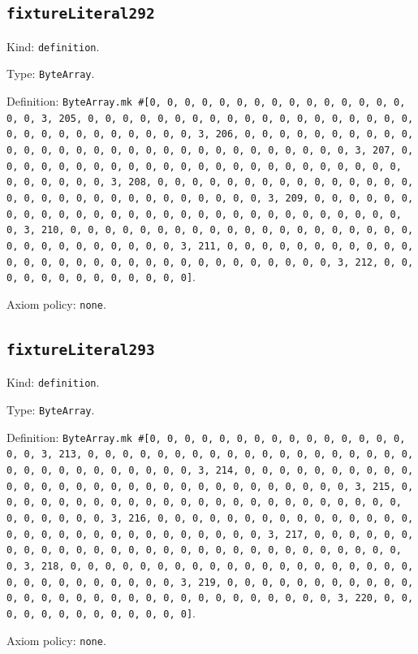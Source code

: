 \documentclass[11pt]{article}
\begin{document}
\subsection*{\texttt{fixtureLiteral292}}
\noindent Kind: \texttt{definition}.\par
\noindent Type: \texttt{ByteArray}.\par
\noindent Definition: \texttt{ByteArray.mk \#[0, 0, 0, 0, 0, 0, 0, 0, 0, 0, 0, 0, 0, 0, 0, 0, 0, 3, 205, 0, 0, 0, 0, 0, 0, 0, 0, 0, 0, 0, 0, 0, 0, 0, 0, 0, 0, 0, 0, 0, 0, 0, 0, 0, 0, 0, 0, 0, 0, 3, 206, 0, 0, 0, 0, 0, 0, 0, 0, 0, 0, 0, 0, 0, 0, 0, 0, 0, 0, 0, 0, 0, 0, 0, 0, 0, 0, 0, 0, 0, 0, 3, 207, 0, 0, 0, 0, 0, 0, 0, 0, 0, 0, 0, 0, 0, 0, 0, 0, 0, 0, 0, 0, 0, 0, 0, 0, 0, 0, 0, 0, 0, 0, 3, 208, 0, 0, 0, 0, 0, 0, 0, 0, 0, 0, 0, 0, 0, 0, 0, 0, 0, 0, 0, 0, 0, 0, 0, 0, 0, 0, 0, 0, 0, 0, 3, 209, 0, 0, 0, 0, 0, 0, 0, 0, 0, 0, 0, 0, 0, 0, 0, 0, 0, 0, 0, 0, 0, 0, 0, 0, 0, 0, 0, 0, 0, 0, 3, 210, 0, 0, 0, 0, 0, 0, 0, 0, 0, 0, 0, 0, 0, 0, 0, 0, 0, 0, 0, 0, 0, 0, 0, 0, 0, 0, 0, 0, 0, 0, 3, 211, 0, 0, 0, 0, 0, 0, 0, 0, 0, 0, 0, 0, 0, 0, 0, 0, 0, 0, 0, 0, 0, 0, 0, 0, 0, 0, 0, 0, 0, 0, 3, 212, 0, 0, 0, 0, 0, 0, 0, 0, 0, 0, 0, 0, 0]}.\par
\noindent Axiom policy: \texttt{none}.\par
\subsection*{\texttt{fixtureLiteral293}}
\noindent Kind: \texttt{definition}.\par
\noindent Type: \texttt{ByteArray}.\par
\noindent Definition: \texttt{ByteArray.mk \#[0, 0, 0, 0, 0, 0, 0, 0, 0, 0, 0, 0, 0, 0, 0, 0, 0, 3, 213, 0, 0, 0, 0, 0, 0, 0, 0, 0, 0, 0, 0, 0, 0, 0, 0, 0, 0, 0, 0, 0, 0, 0, 0, 0, 0, 0, 0, 0, 0, 3, 214, 0, 0, 0, 0, 0, 0, 0, 0, 0, 0, 0, 0, 0, 0, 0, 0, 0, 0, 0, 0, 0, 0, 0, 0, 0, 0, 0, 0, 0, 0, 3, 215, 0, 0, 0, 0, 0, 0, 0, 0, 0, 0, 0, 0, 0, 0, 0, 0, 0, 0, 0, 0, 0, 0, 0, 0, 0, 0, 0, 0, 0, 0, 3, 216, 0, 0, 0, 0, 0, 0, 0, 0, 0, 0, 0, 0, 0, 0, 0, 0, 0, 0, 0, 0, 0, 0, 0, 0, 0, 0, 0, 0, 0, 0, 3, 217, 0, 0, 0, 0, 0, 0, 0, 0, 0, 0, 0, 0, 0, 0, 0, 0, 0, 0, 0, 0, 0, 0, 0, 0, 0, 0, 0, 0, 0, 0, 3, 218, 0, 0, 0, 0, 0, 0, 0, 0, 0, 0, 0, 0, 0, 0, 0, 0, 0, 0, 0, 0, 0, 0, 0, 0, 0, 0, 0, 0, 0, 0, 3, 219, 0, 0, 0, 0, 0, 0, 0, 0, 0, 0, 0, 0, 0, 0, 0, 0, 0, 0, 0, 0, 0, 0, 0, 0, 0, 0, 0, 0, 0, 0, 3, 220, 0, 0, 0, 0, 0, 0, 0, 0, 0, 0, 0, 0, 0]}.\par
\noindent Axiom policy: \texttt{none}.\par
\end{document}
